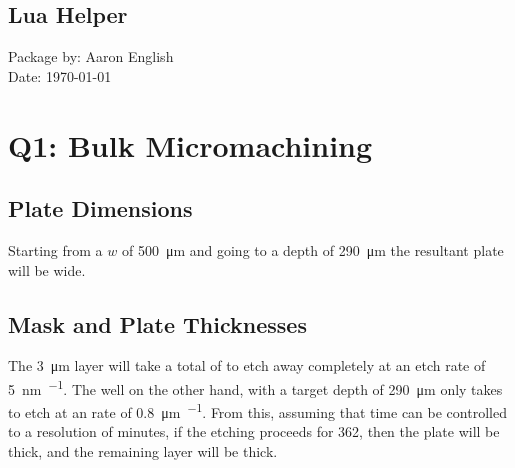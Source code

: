 \documentclass[hidelinks, 12pt]{article}%
\begin{document}
    \frontmatter
        \begin{center}
            \vspace*{1cm}
            \section*{\Huge Lua Helper}%
            \vspace{6cm}
            \begin{centering}
                \Large{Package by: Aaron English\\
                Date: \today}
            \end{centering}
        \end{center}
        \thispagestyle{empty}

    \clearpage
    \mainmatter
        \section{Q1: Bulk Micromachining}
            \subsection{Plate Dimensions}
                Starting from a $w$ of \SI{500}{\micro\meter} and going to a depth of 
                \SI{290}{\micro\meter} the resultant plate will be 
                 wide.

            \subsection{Mask and Plate Thicknesses}
                The \SI{3}{\micro\meter}  layer will take a total of 
                 to etch away completely at an etch rate
                of \SI{5}{\nano\meter\per\min}. The well on the other hand, with a target depth of 
                \SI{290}{\micro\meter} only takes  to
                etch at an rate of \SI{0.8}{\micro\meter\per\min}. From this, assuming that time 
                can be controlled to a resolution of minutes, if the etching proceeds for 
                \SI{362}{\min}, then the plate will be 
                 thick, 
                and the remaining  layer will be 
                 thick.
\end{document}
